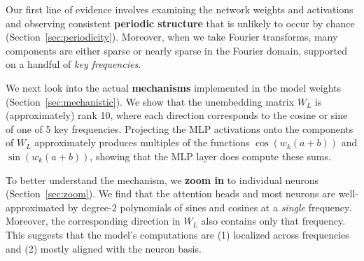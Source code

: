 \documentclass{article} %
\newcommand{\cosp}[1]{\cos \left ( #1 \right )}
\newcommand{\sinp}[1]{\sin \left ( #1 \right )}
\begin{document}
\newcommand{\kf}{key}

Our first line of evidence involves examining the network weights and activations and observing consistent {\bf periodic structure} that is unlikely to occur by chance (Section~\ref{sec:periodicity}). Moreover, when we take Fourier transforms, many components are either sparse or nearly sparse in the Fourier domain, supported on a handful of \emph{\kf{} frequencies}.%

We next look into the actual {\bf mechanisms} implemented in the model weights (Section~\ref{sec:mechanistic}). We show that the unembedding matrix $W_L$ is (approximately) rank 10, where each direction corresponds to the cosine or sine of one of 5 \kf{} frequencies. Projecting the MLP activations onto the components of $W_L$ approximately produces multiples of the functions $\cosp{w_k(a+b)}$ and $\sinp{w_k(a+b)}$, showing that the MLP layer does compute these sums.


To better understand the mechanism, we {\bf zoom in} to individual neurons (Section~\ref{sec:zoom}). We find that the attention heads and most neurons are well-approximated by degree-$2$ polynomials of sines and cosines at a \emph{single} frequency. Moreover, the corresponding direction in $W_L$ also contains only that frequency. This suggests that the model's computations are (1) localized across frequencies and (2) mostly aligned with the neuron basis.
\end{document}

